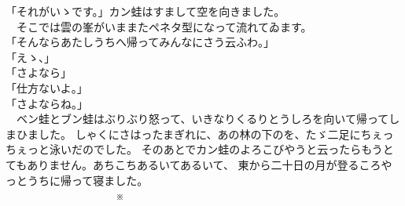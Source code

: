 \documentclass[
a4paper,
book]
{tarticle}
\begin{document}
「それがいゝです。」カン蛙はすまして空を向きました。\\
　そこでは雲の峯がいままたペネタ型になって流れてゐます。\\
「そんならあたしうちへ帰ってみんなにさう云ふわ。」\\
「えゝ、」\\
「さよなら」\\
「仕方ないよ。」\\
「さよならね。」\\
　ベン蛙とブン蛙はぶりぶり怒って、いきなりくるりとうしろを向いて帰ってしまひました。
しゃくにさはったまぎれに、あの林の下のを、たゞ二足にちぇっちぇっと泳いだのでした。
そのあとでカン蛙のよろこびやうと云ったらもうとてもありません。あちこちあるいてあるいて、
東から二十日の月が登るころやっとうちに帰って寝ました。\\

　　　　　　　　　　※\\
\end{document}
